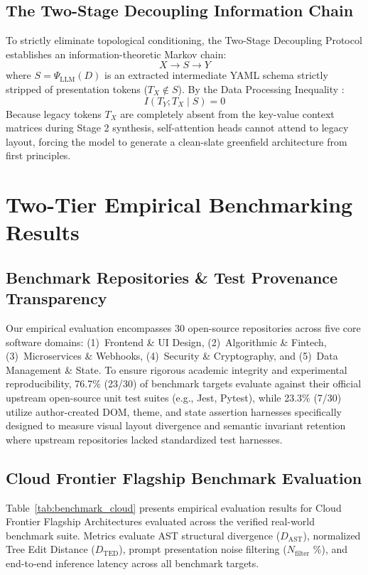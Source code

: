 \documentclass[10pt,journal,compsoc]{IEEEtran}
\begin{document}
\subsection{The Two-Stage Decoupling Information Chain}
To strictly eliminate topological conditioning, the Two-Stage Decoupling Protocol establishes an information-theoretic Markov chain:
\begin{equation}
X \longrightarrow S \longrightarrow Y
\end{equation}
where $S = \Psi_{\text{LLM}}(D)$ is an extracted intermediate YAML schema strictly stripped of presentation tokens ($T_X \notin S$). By the Data Processing Inequality \cite{cover2006elements}:
\begin{equation}
I(T_Y ; T_X \mid S) = 0
\label{eq:dpi}
\end{equation}
Because legacy tokens $T_X$ are completely absent from the key-value context matrices during Stage 2 synthesis, self-attention heads cannot attend to legacy layout, forcing the model to generate a clean-slate greenfield architecture from first principles.

\section{Two-Tier Empirical Benchmarking Results}

\subsection{Benchmark Repositories \& Test Provenance Transparency}
Our empirical evaluation encompasses 30 open-source repositories across five core software domains: (1)~Frontend \& UI Design, (2)~Algorithmic \& Fintech, (3)~Microservices \& Webhooks, (4)~Security \& Cryptography, and (5)~Data Management \& State. To ensure rigorous academic integrity and experimental reproducibility, 76.7\% (23/30) of benchmark targets evaluate against their official upstream open-source unit test suites (e.g., Jest, Pytest), while 23.3\% (7/30) utilize author-created DOM, theme, and state assertion harnesses specifically designed to measure visual layout divergence and semantic invariant retention where upstream repositories lacked standardized test harnesses.

\subsection{Cloud Frontier Flagship Benchmark Evaluation}
Table~\ref{tab:benchmark_cloud} presents empirical evaluation results for Cloud Frontier Flagship Architectures evaluated across the verified real-world benchmark suite. Metrics evaluate AST structural divergence ($D_{\text{AST}}$), normalized Tree Edit Distance ($D_{\text{TED}}$), prompt presentation noise filtering ($N_{\text{filter}}$ \%), and end-to-end inference latency across all benchmark targets.
\end{document}

